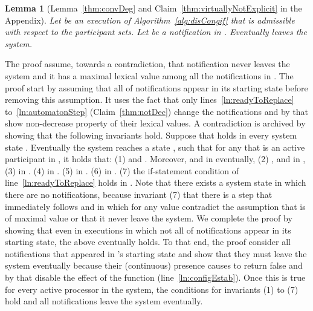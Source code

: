 \documentclass[11pt]{article}
\newtheorem{lemma}[theorem]{Lemma}
\newenvironment{proofsketch}{\noindent{\bf Proof Sketch.}}{\hfill}
\begin{document}
{\begin{proofsketch}
\begin{lemma}[Lemma~\ref{thm:convDeg} and Claim~\ref{thm:virtuallyNotExplicit} in the Appendix]
\label{thm:convDegShort}
Let  be an execution of Algorithm~\ref{alg:disCongif} that is admissible with respect to the participant sets. 
Let  be a notification in . Eventually  leaves the system.
\end{lemma}
\begin{proofsketch}
The proof assume, towards a contradiction, that notification  never leaves the system and it has a maximal lexical value among all the notifications in . The proof start by assuming that all of  notifications appear in its starting state before removing this assumption. It uses the fact that only lines~\ref{ln:readyToReplace} to~\ref{ln:automatonStep} (Claim~\ref{thm:notDec}) change the notifications and by that show non-decrease property of their lexical values. A contradiction is archived by showing that the following invariants hold.  
Suppose that  holds in  every system state . Eventually the system reaches a state , such that for any  that is an active participant in , it holds that:
(1)  and . Moreover,  and  in  eventually,
(2) ,  and   in ,
(3)   in .
(4)   in . 
(5)  in . 
(6)   in . 
(7) the if-statement condition of line~\ref{ln:readyToReplace} holds in .
Note that there exists a system state
 in which there are no notifications, because invariant (7) that there is a step  that immediately follows  and in which  for any  value contradict the assumption that  is of maximal value or that it never leave the system. We complete the proof by showing that even in executions in which not all of  notifications appear in its starting state, the above eventually holds. To that end, the proof consider all notifications that appeared in 's starting state and show that they must leave the system eventually because their (continuous) presence causes  to return false and by that disable the effect of the function  (line~\ref{ln:configEstab}). Once this is true for every active processor in the system, the conditions for invariants (1) to (7) hold and all notifications leave the system eventually.   
\hfill\end{proofsketch}
\end{proofsketch}

}
\end{document}
